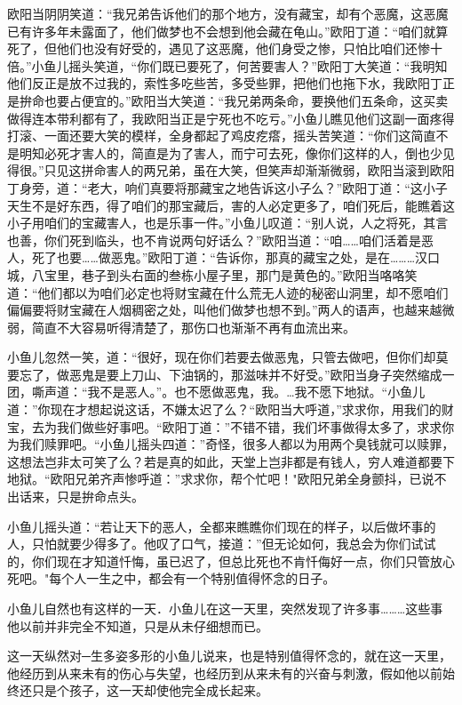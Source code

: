\documentclass[12pt,oneside]{book}
\begin{document}
欧阳当阴阴笑道：``我兄弟告诉他们的那个地方，没有藏宝，却有个恶魔，这恶魔已有许多年未露面了，他们做梦也不会想到他会藏在龟山。''欧阳丁道：``咱们就算死了，但他们也没有好受的，遇见了这恶魔，他们身受之惨，只怕比咱们还惨十倍。''小鱼儿摇头笑道，``你们既已要死了，何苦要害人？''欧阳丁大笑道：``我明知他们反正是放不过我的，索性多吃些苦，多受些罪，把他们也拖下水，我欧阳丁正是拚命也要占便宜的。''欧阳当大笑道：``我兄弟两条命，要换他们五条命，这买卖做得连本带利都有了，我欧阳当正是宁死也不吃亏。''小鱼儿瞧见他们这副一面疼得打滚、一面还要大笑的模样，全身都起了鸡皮疙瘩，摇头苦笑道：``你们这简直不是明知必死才害人的，简直是为了害人，而宁可去死，像你们这样的人，倒也少见得很。''只见这拼命害人的两兄弟，虽在大笑，但笑声却渐渐微弱，欧阳当滚到欧阳丁身旁，道：``老大，响们真要将那藏宝之地告诉这小子么？''欧阳丁道：``这小子天生不是好东西，得了咱们的那宝藏后，害的人必定更多了，咱们死后，能瞧着这小子用咱们的宝藏害人，也是乐事一件。''小鱼儿叹道：``别人说，人之将死，其言也善，你们死到临头，也不肯说两句好话么？''欧阳当道：``咱\ldots\ldots 咱们活着是恶人，死了也要\ldots\ldots 做恶鬼。''欧阳丁道：``告诉你，那真的藏宝之处，是在\ldots\ldots\ldots 汉口城，八宝里，巷子到头右面的叁栋小屋子里，那门是黄色的。''欧阳当咯咯笑道：``他们都以为咱们必定也将财宝藏在什么荒无人迹的秘密山洞里，却不愿咱们偏偏要将财宝藏在人烟稠密之处，叫他们做梦也想不到。''两人的语声，也越来越微弱，简直不大容易听得清楚了，那伤口也渐渐不再有血流出来。

小鱼儿忽然一笑，道：``很好，现在你们若要去做恶鬼，只管去做吧，但你们却莫要忘了，做恶鬼是要上刀山、下油锅的，那滋味并不好受。''欧阳当身子突然缩成一团，嘶声道：``我不是恶人。''。也不愿做恶鬼，我。\ldots 我不愿下地狱。``小鱼儿道：''你现在才想起说这话，不嫌太迟了么？``欧阳当大呼道，''求求你，用我们的财宝，去为我们做些好事吧。``欧阳丁道：''不错不错，我们坏事做得太多了，求求你为我们赎罪吧。``小鱼儿摇头四道：''奇怪，很多人都以为用两个臭钱就可以赎罪，这想法岂非太可笑了么？若是真的如此，天堂上岂非都是有钱人，穷人难道都要下地狱。``欧阳兄弟齐声惨呼道：''求求你，帮个忙吧！"欧阳兄弟全身颤抖，已说不出话来，只是拚命点头。

小鱼儿摇头道：``若让天下的恶人，全都来瞧瞧你们现在的样子，以后做坏事的人，只怕就要少得多了。他叹了口气，接道：''但无论如何，我总会为你们试试的，你们现在才知道忏悔，虽已迟了，但总比死也不肯忏侮好一点，你们只管放心死吧。"每个人一生之中，都会有一个特别值得怀念的日子。

小鱼儿自然也有这样的一天．小鱼儿在这一天里，突然发现了许多事\ldots\ldots\ldots 这些事他以前并非完全不知道，只是从未仔细想而已。

这一天纵然对─生多姿多形的小鱼儿说来，也是特别值得怀念的，就在这一天里，他经历到从来未有的伤心与失望，也经历到从来未有的兴奋与刺激，假如他以前始终还只是个孩子，这一天却使他完全成长起来。
\end{document}
